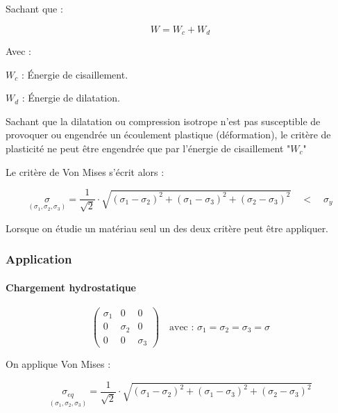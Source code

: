 \documentclass[12pt,a4paper]{report}
\begin{document}
	Sachant que :
	
	\[ W = W_{c} + W_{d} \]
	
	Avec : 
	
	$W_{c}$ : Énergie de cisaillement.
	
	$W_{d}$ : Énergie de dilatation.
	
	
	\begin{tcolorbox}[colback=gray!20, colframe=black, title=Remarque]
		Sachant que la dilatation ou compression isotrope n'est pas susceptible de provoquer ou engendrée un écoulement plastique (déformation), le critère de plasticité ne peut être engendrée que par l'énergie de cisaillement "$W_{c}$"
	\end{tcolorbox}
	
	
	\vspace{\baselineskip}
	
	Le critère de Von Mises s'écrit alors : 
	
	\[ \underset{(\sigma_{1},\sigma_{2},\sigma_{3})}{\sigma} = \dfrac{1}{\sqrt{2}} \cdot \sqrt{ (\sigma_{1} - \sigma_{2})^{2} + (\sigma_{1} - \sigma_{3})^{2} + (\sigma_{2} - \sigma_{3})^{2} } \quad<\quad \sigma_{y} \]
	
	\begin{tcolorbox}[colback=gray!20, colframe=black, title=Remarque]
		Lorsque on étudie un matériau seul un des deux critère peut être appliquer.
	\end{tcolorbox}
	
	
	
	\subsubsection{Application}
	
	\paragraph{Chargement hydrostatique}
	
	\[ \begin{pmatrix}
		\sigma_{1}&0&0\\
		0&\sigma_{2}&0\\
		0&0&\sigma_{3}
	\end{pmatrix} \quad \text{avec : } \sigma_{1} = \sigma_{2} = \sigma_{3} = \sigma \]
	
	On applique Von Mises : 
	
	\[ \underset{(\sigma_{1},\sigma_{2},\sigma_{3})}{\sigma_{eq}} = \dfrac{1}{\sqrt{2}} \cdot \sqrt{ (\sigma_{1} - \sigma_{2})^{2} + (\sigma_{1} - \sigma_{3})^{2} + (\sigma_{2} - \sigma_{3})^{2} } \]
	
\end{document}
